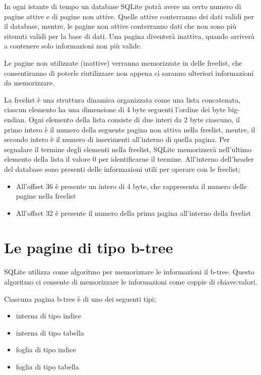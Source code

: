 In ogni istante di tempo un database SQLite potrà avere un certo numero di pagine attive e di pagine non attive. Quelle attive conterranno dei dati validi per il database, mentre, le pagine non attive conterranno dati che non sono più ritenuti validi per la base di dati.
Una pagina diventerà inattiva, quando arriverà a contenere solo informazioni non più valide. 

Le pagine non utilizzate (inattive) verranno memorizzate in delle freelist, che consentiranno di poterle riutilizzare non appena ci saranno ulteriori informazioni da memorizzare.

La freelist è una struttura dinamica organizzata come una lista concatenata, ciascun elemento ha una dimensione di 4 byte seguenti l’ordine dei byte big-endian. Ogni elemento della lista consiste di due interi da 2 byte ciascuno, il primo intero è il numero della seguente pagina non attiva nella freelist, mentre, il secondo intero è il numero di inserimenti all’interno di quella pagina. Per segnalare il termine degli elementi nella freelist, SQLite memorizzerà nell’ultimo elemento della lista il valore 0 per identificarne il termine.
All’interno dell’header del database sono presenti delle informazioni utili per operare con le freelist;
\begin{itemize}
\item All'offset 36 è presente un intero di 4 byte, che rappresenta il numero delle pagine nella freelist
\item All’offset 32 è presente il numero della prima pagina all’interno della freelist
\end{itemize}


\section{Le pagine di tipo b-tree}

SQLite utilizza come algoritmo per memorizzare le informazioni il b-tree. Questo algoritmo ci consente di memorizzare le informazioni come coppie di chiave:valori.

\medskip

Ciascuna pagina b-tree è di uno dei seguenti tipi;
\begin{itemize}
\item interna di tipo indice
\item interna di tipo tabella
\item foglia di tipo indice
\item foglia di tipo tabella
\end{itemize}

